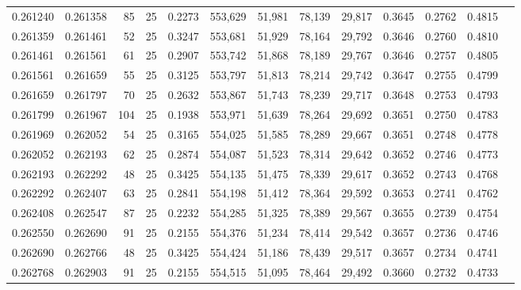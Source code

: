 \begin{tabular}{rrrrrrrrrrrrr}
0.261240 & 0.261358 &    85 &  25 &                                     0.2273 & 553,629 &  51,981 &  78,139 &  29,817 & 0.3645 & 0.2762 & 0.4815 \\
0.261359 & 0.261461 &    52 &  25 &                                     0.3247 & 553,681 &  51,929 &  78,164 &  29,792 & 0.3646 & 0.2760 & 0.4810 \\
0.261461 & 0.261561 &    61 &  25 &                                     0.2907 & 553,742 &  51,868 &  78,189 &  29,767 & 0.3646 & 0.2757 & 0.4805 \\
0.261561 & 0.261659 &    55 &  25 &                                     0.3125 & 553,797 &  51,813 &  78,214 &  29,742 & 0.3647 & 0.2755 & 0.4799 \\
0.261659 & 0.261797 &    70 &  25 &                                     0.2632 & 553,867 &  51,743 &  78,239 &  29,717 & 0.3648 & 0.2753 & 0.4793 \\
0.261799 & 0.261967 &   104 &  25 &                                     0.1938 & 553,971 &  51,639 &  78,264 &  29,692 & 0.3651 & 0.2750 & 0.4783 \\
0.261969 & 0.262052 &    54 &  25 &                                     0.3165 & 554,025 &  51,585 &  78,289 &  29,667 & 0.3651 & 0.2748 & 0.4778 \\
0.262052 & 0.262193 &    62 &  25 &                                     0.2874 & 554,087 &  51,523 &  78,314 &  29,642 & 0.3652 & 0.2746 & 0.4773 \\
0.262193 & 0.262292 &    48 &  25 &                                     0.3425 & 554,135 &  51,475 &  78,339 &  29,617 & 0.3652 & 0.2743 & 0.4768 \\
0.262292 & 0.262407 &    63 &  25 &                                     0.2841 & 554,198 &  51,412 &  78,364 &  29,592 & 0.3653 & 0.2741 & 0.4762 \\
0.262408 & 0.262547 &    87 &  25 &                                     0.2232 & 554,285 &  51,325 &  78,389 &  29,567 & 0.3655 & 0.2739 & 0.4754 \\
0.262550 & 0.262690 &    91 &  25 &                                     0.2155 & 554,376 &  51,234 &  78,414 &  29,542 & 0.3657 & 0.2736 & 0.4746 \\
0.262690 & 0.262766 &    48 &  25 &                                     0.3425 & 554,424 &  51,186 &  78,439 &  29,517 & 0.3657 & 0.2734 & 0.4741 \\
0.262768 & 0.262903 &    91 &  25 &                                     0.2155 & 554,515 &  51,095 &  78,464 &  29,492 & 0.3660 & 0.2732 & 0.4733 \\

\end{tabular}
